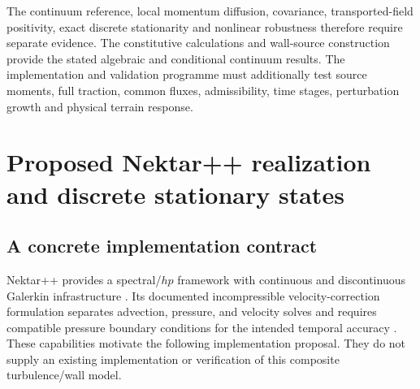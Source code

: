 \documentclass[11pt,a4paper]{article}
\numberwithin{equation}{section}
\begin{document}
The continuum reference, local momentum diffusion, covariance,
transported-field positivity, exact discrete stationarity and
nonlinear robustness therefore require separate evidence.
The constitutive calculations and wall-source construction provide
the stated algebraic and conditional continuum results. The
implementation and validation
programme must additionally test source moments, full traction,
common fluxes, admissibility, time stages, perturbation growth and
physical terrain response.


\section{Proposed Nektar++ realization and discrete stationary states}
\label{num:implementation}

\subsection{A concrete implementation contract}

Nektar++ provides a spectral/$hp$ framework with continuous and
discontinuous Galerkin infrastructure
\citep{Nektar2015,Nektar2020}.  Its documented incompressible
velocity-correction formulation separates advection, pressure, and
velocity solves and requires compatible pressure boundary conditions
for the intended temporal accuracy \citep{NektarTheory}.  These
capabilities motivate the following implementation proposal.  They
do not supply an existing implementation or verification of this
composite turbulence/wall model.
\end{document}
